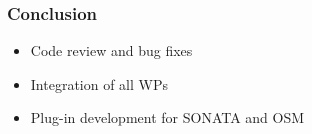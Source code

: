 \begin{frame}
\frametitle{Conclusion}

\begin{itemize}
	\item Code review and bug fixes
	\item Integration of all WPs
	\item Plug-in development for SONATA and OSM
	
\end{itemize}

\end{frame}